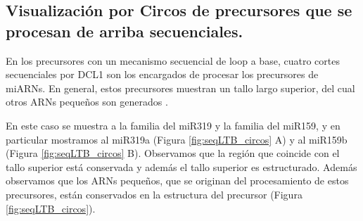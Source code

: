 \subsection{Visualización por Circos de precursores que se procesan de arriba secuenciales.}

En los precursores con un mecanismo secuencial de loop a base, cuatro cortes secuenciales por DCL1 son los encargados de procesar los precursores de miARNs.
En general, estos precursores muestran un tallo largo superior, del cual otros ARNs pequeños son generados \citep{pmid19850910,Bologna2009,Bologna2013}.

En este caso se muestra a la familia del miR319 y la familia del miR159, y en particular mostramos al miR319a (Figura \ref{fig:seqLTB_circos} A) y al miR159b (Figura \ref{fig:seqLTB_circos} B).
Observamos que la región que coincide con el tallo superior está conservada y además el tallo superior es estructurado.
Además observamos que los ARNs pequeños, que se originan del procesamiento de estos precursores, están conservados en la estructura del precursor (Figura \ref{fig:seqLTB_circos}).




